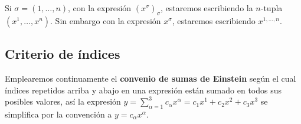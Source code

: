 \begin{notation}
  Si $\sigma=(1,\ldots,n)$, con la expresión $(x^\sigma)_\sigma$, estaremos escribiendo la $n$-tupla $(x^1,\ldots,
  x^n)$.
  Sin embargo con la expresión $x^\sigma$, estaremos escribiendo $x^{1,\ldots,n}$.
\end{notation}

\subsection{Criterio de índices}\label{subsec:criterio-de-indices}

Emplearemos continuamente el \textbf{convenio de sumas de Einstein} según el cual
índices repetidos arriba y abajo en una expresión están sumado en todos sus posibles valores,
así la expresión $y=\sum_{\alpha=1}^3 c_\alpha x^\alpha=c_1 x^1 + c_2 x^2 + c_3 x^3$
se simplifica por la convención a $y = c_\alpha x^\alpha$.
